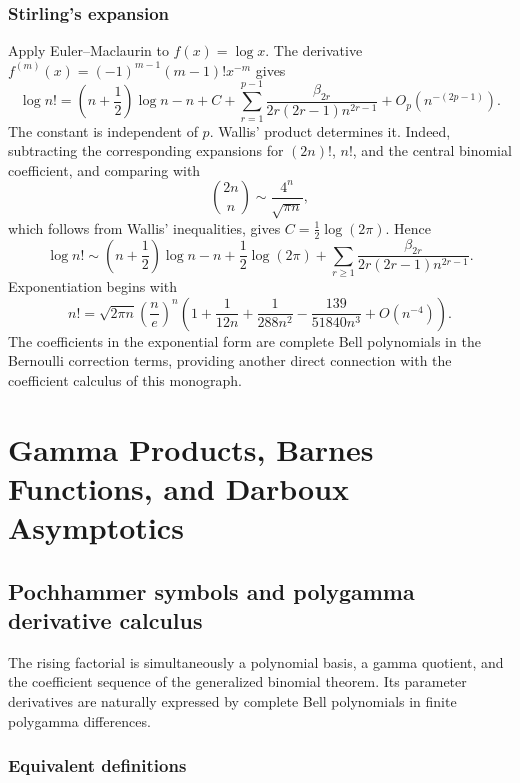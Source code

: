 \documentclass[11pt,a4paper,oneside,openany]{book}
\theoremstyle{definition}
\theoremstyle{remark}
\begin{document}
\section{Stirling's expansion}

Apply Euler--Maclaurin to $f(x)=\log x$.  The derivative
$f^{(m)}(x)=(-1)^{m-1}(m-1)!x^{-m}$ gives
\begin{equation}
 \log n!
 =\left(n+\frac12\right)\log n-n+C
 +\sum_{r=1}^{p-1}
  \frac{\beta_{2r}}{2r(2r-1)n^{2r-1}}
 +O_p(n^{-(2p-1)}).
 \label{new:eq:stirling-em-constant}
\end{equation}
The constant is independent of $p$.  Wallis' product determines it.
Indeed, subtracting the corresponding expansions for $(2n)!$, $n!$, and the
central binomial coefficient, and comparing with
\[
 \binom{2n}{n}\sim\frac{4^n}{\sqrt{\pi n}},
\]
which follows from Wallis' inequalities, gives $C=\frac12\log(2\pi)$.  Hence
\begin{equation}
 \log n!
 \sim\left(n+\frac12\right)\log n-n+\frac12\log(2\pi)
 +\sum_{r\ge1}\frac{\beta_{2r}}{2r(2r-1)n^{2r-1}}.
 \label{new:eq:stirling-log}
\end{equation}
Exponentiation begins with
\begin{equation}
 n!=\sqrt{2\pi n}\left(\frac ne\right)^n
 \left(1+\frac1{12n}+\frac1{288n^2}
       -\frac{139}{51840n^3}+O(n^{-4})\right).
 \label{new:eq:stirling-factorial}
\end{equation}
The coefficients in the exponential form are complete Bell polynomials in the
Bernoulli correction terms, providing another direct connection with the
coefficient calculus of this monograph.


\part{Gamma Products, Barnes Functions, and Darboux Asymptotics}

\chapter{Pochhammer symbols and polygamma derivative calculus}
\label{ch:pochhammer-polygamma}

The rising factorial is simultaneously a polynomial basis, a gamma quotient,
and the coefficient sequence of the generalized binomial theorem.  Its
parameter derivatives are naturally expressed by complete Bell polynomials in
finite polygamma differences.

\section{Equivalent definitions}
\end{document}
